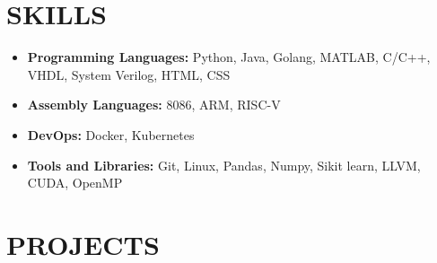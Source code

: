 \documentclass[11pt,a4paper,sans]{moderncv}        %
\begin{document}
\section{SKILLS}

\vspace{1pt}

\begin{itemize}

\item \textbf{Programming Languages: }Python, Java, Golang, MATLAB, C/C++, VHDL, System Verilog, HTML, CSS

\vspace{1pt}


\item \textbf{Assembly Languages: }8086, ARM, RISC-V 

\vspace{1pt} 

\item \textbf{DevOps: }Docker, Kubernetes
\vspace{1pt}

\item \textbf{Tools and Libraries: }Git, Linux, Pandas, Numpy, Sikit learn, LLVM, CUDA, OpenMP

\end{itemize}

\section{PROJECTS}

\vspace{4pt}
\end{document}
